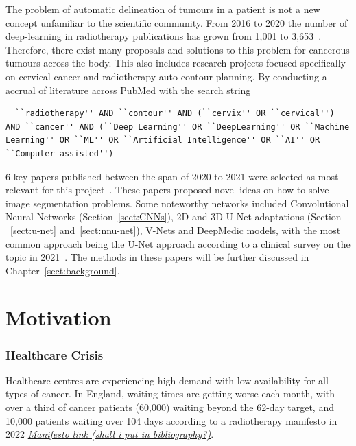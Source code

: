 \documentclass[11pt,twoside]{report}
\begin{document}
The problem of automatic delineation of tumours in a patient is not a new concept unfamiliar to the scientific community. From 2016 to 2020 the number of deep-learning in radiotherapy publications has grown from 1,001 to 3,653~\cite{Lin2021-oz}. Therefore, there exist many proposals and solutions to this problem for cancerous tumours across the body. This also includes research projects focused specifically on cervical cancer and radiotherapy auto-contour planning. By conducting a accrual of literature across PubMed with the search string

\begin{lstlisting}
  ``radiotherapy'' AND ``contour'' AND (``cervix'' OR ``cervical'') AND ``cancer'' AND (``Deep Learning'' OR ``DeepLearning'' OR ``Machine Learning'' OR ``ML'' OR ``Artificial Intelligence'' OR ``AI'' OR ``Computer assisted'')  
\end{lstlisting}

6 key papers published between the span of 2020 to 2021 were selected as most relevant for this project~\cite{Samarasinghe2021-ps,Lin2021-oz,Sartor2020-et,LIU2020184,Rhee2020-ms,LIU2020172}. These papers proposed novel ideas on how to solve image segmentation problems. Some noteworthy networks included Convolutional Neural Networks (Section~\ref{sect:CNNs}), 2D and 3D U-Net adaptations (Section ~\ref{sect:u-net} and~\ref{sect:nnu-net}), V-Nets and DeepMedic models, with the most common approach being the U-Net approach according to a clinical survey on the topic in 2021~\cite{Samarasinghe2021-ps}. The methods in these papers will be further discussed in Chapter~\ref{sect:background}.

\section{Motivation}\label{sect:motivation}

\subsubsection{Healthcare Crisis}

Healthcare centres are experiencing high demand with low availability for all types of cancer. In England, waiting times are getting worse each month, with over a third of cancer patients (60,000) waiting beyond the 62-day target, and 10,000 patients waiting over 104 days according to a radiotherapy manifesto in 2022 \href{https://radiotherapy.org.uk/wp-content/uploads/2022/11/APPGRadiotherapy_Manifesto-Update_2022.pdf}{\textit{Manifesto link (shall i put in bibliography?)}}. 
\end{document}
